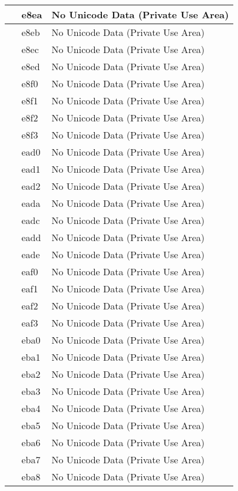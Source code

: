 \documentclass[12pt,letterpaper,openany]{book}
\begin{document}
\begin{center}
\begin{supertabular}{|m{0.25in}|m{0.5in}|m{4in}|}
 & e8ea & No Unicode Data (Private Use Area)\\\hline
 & e8eb & No Unicode Data (Private Use Area)\\\hline
 & e8ec & No Unicode Data (Private Use Area)\\\hline
 & e8ed & No Unicode Data (Private Use Area)\\\hline
 & e8f0 & No Unicode Data (Private Use Area)\\\hline
 & e8f1 & No Unicode Data (Private Use Area)\\\hline
 & e8f2 & No Unicode Data (Private Use Area)\\\hline
 & e8f3 & No Unicode Data (Private Use Area)\\\hline
 & ead0 & No Unicode Data (Private Use Area)\\\hline
 & ead1 & No Unicode Data (Private Use Area)\\\hline
 & ead2 & No Unicode Data (Private Use Area)\\\hline
 & eada & No Unicode Data (Private Use Area)\\\hline
 & eadc & No Unicode Data (Private Use Area)\\\hline
 & eadd & No Unicode Data (Private Use Area)\\\hline
 & eade & No Unicode Data (Private Use Area)\\\hline
 & eaf0 & No Unicode Data (Private Use Area)\\\hline
 & eaf1 & No Unicode Data (Private Use Area)\\\hline
 & eaf2 & No Unicode Data (Private Use Area)\\\hline
 & eaf3 & No Unicode Data (Private Use Area)\\\hline
 & eba0 & No Unicode Data (Private Use Area)\\\hline
 & eba1 & No Unicode Data (Private Use Area)\\\hline
 & eba2 & No Unicode Data (Private Use Area)\\\hline
 & eba3 & No Unicode Data (Private Use Area)\\\hline
 & eba4 & No Unicode Data (Private Use Area)\\\hline
 & eba5 & No Unicode Data (Private Use Area)\\\hline
 & eba6 & No Unicode Data (Private Use Area)\\\hline
 & eba7 & No Unicode Data (Private Use Area)\\\hline
 & eba8 & No Unicode Data (Private Use Area)\\\hline

\end{supertabular}
\end{center}
\end{document}
